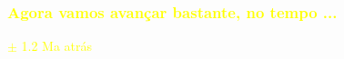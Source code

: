 \documentclass[aspectratio=169]{beamer} %
\begin{document}
{
	
	\begin{frame}
		\frametitle{\textcolor{yellow}{Agora vamos avançar bastante, no tempo ...}}
	\transdissolve	

	\flushright
    \textcolor{yellow}{$\pm$ 1.2 Ma atrás}
	\end{frame}
}
\end{document}
